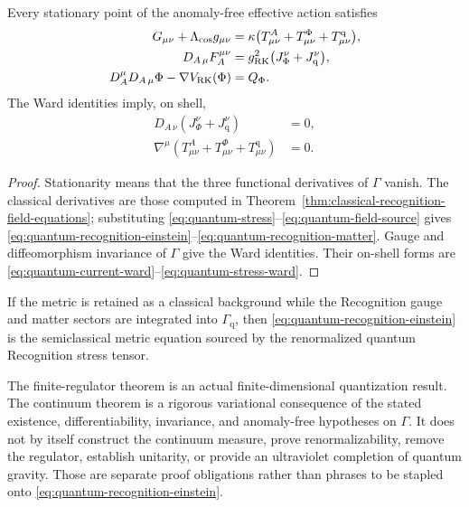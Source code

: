 \begin{theorem}
\label{thm:quantum-effective-recognition}
Every stationary point of the anomaly-free effective action satisfies
\begin{align}
G_{\mu\nu}+\Lambda_{\mathrm{cos}}g_{\mu\nu}
&=\kappa\bigl(
T^A_{\mu\nu}+T^\Phi_{\mu\nu}+T^{\mathrm q}_{\mu\nu}
\bigr),
\label{eq:quantum-recognition-einstein}\\
D_{A\,\mu}F_A^{\mu\nu}
&=g_{\mathrm{RK}}^2\bigl(J_\Phi^\nu+J_{\mathrm q}^\nu\bigr),
\label{eq:quantum-recognition-gauge}\\
D_A^\mu D_{A\,\mu}\Phi-\nabla V_{\mathrm{RK}}(\Phi)
&=Q_\Phi.
\label{eq:quantum-recognition-matter}
\end{align}
The Ward identities imply, on shell,
\begin{align}
D_{A\,\nu}(J_\Phi^\nu+J_{\mathrm q}^\nu)&=0,
\label{eq:quantum-current-ward}\\
\nabla^\mu(T^A_{\mu\nu}+T^\Phi_{\mu\nu}+T^{\mathrm q}_{\mu\nu})&=0.
\label{eq:quantum-stress-ward}
\end{align}
\end{theorem}

\begin{proof}
Stationarity means that the three functional derivatives of $\Gamma$ vanish. The classical derivatives are those computed in Theorem~\ref{thm:classical-recognition-field-equations}; substituting \eqref{eq:quantum-stress}--\eqref{eq:quantum-field-source} gives \eqref{eq:quantum-recognition-einstein}--\eqref{eq:quantum-recognition-matter}. Gauge and diffeomorphism invariance of $\Gamma$ give the Ward identities. Their on-shell forms are \eqref{eq:quantum-current-ward}--\eqref{eq:quantum-stress-ward}.
\end{proof}

\begin{corollary}
If the metric is retained as a classical background while the Recognition gauge and matter sectors are integrated into $\Gamma_{\mathrm q}$, then \eqref{eq:quantum-recognition-einstein} is the semiclassical metric equation sourced by the renormalized quantum Recognition stress tensor.
\end{corollary}

\begin{remark}
The finite-regulator theorem is an actual finite-dimensional quantization result. The continuum theorem is a rigorous variational consequence of the stated existence, differentiability, invariance, and anomaly-free hypotheses on $\Gamma$. It does not by itself construct the continuum measure, prove renormalizability, remove the regulator, establish unitarity, or provide an ultraviolet completion of quantum gravity. Those are separate proof obligations rather than phrases to be stapled onto \eqref{eq:quantum-recognition-einstein}.
\end{remark}
